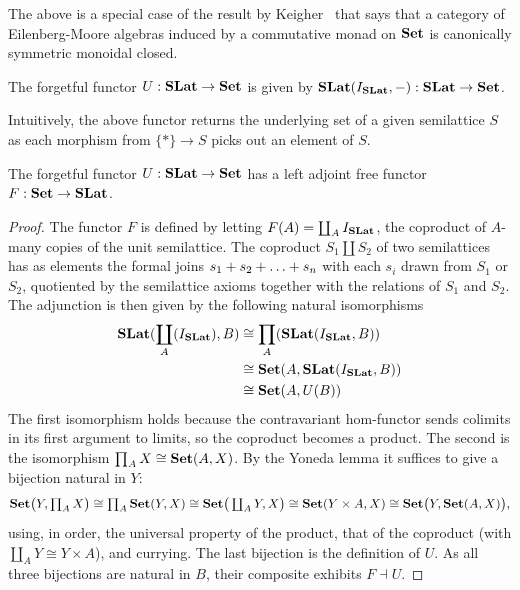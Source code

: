 \begin{remark}
The above is a special case of the result by Keigher~\cite{keigher_symmetric_nodate} that says that a category of Eilenberg-Moore algebras induced by a commutative monad on $\mathbf{Set}$ is canonically symmetric monoidal closed.
\end{remark}
\begin{definition}
	The forgetful functor $U : \mathbf{SLat} \to \mathbf{Set}$ is given by $\mathbf{SLat}(I_{\mathbf{SLat}}, -) : \mathbf{SLat} \to \mathbf{Set}$.
\end{definition}

Intuitively, the above functor returns the underlying set of a given semilattice $S$ as each morphism from $\{*\} \to S$ picks out an element of $S$.

\begin{proposition}\label{prop:slat-free}
	The forgetful functor $U : \mathbf{SLat} \to \mathbf{Set}$ has a left adjoint free functor $F : \mathbf{Set} \to \mathbf{SLat}$.
\end{proposition}
\begin{proof}
	The functor $F$ is defined by letting $F(A) = \coprod_{A} I_{\mathbf{SLat}}$, the coproduct of $A$-many copies of the unit semilattice.
	The coproduct $S_{1} \coprod S_{2}$ of two semilattices has as elements the formal joins $s_{1} + s_{2} + \ldots + s_{n}$ with each $s_{i}$ drawn from $S_{1}$ or $S_{2}$, quotiented by the semilattice axioms together with the relations of $S_{1}$ and $S_{2}$.
	The adjunction is then given by the following natural isomorphisms
	\begin{align*}
		\mathbf{SLat}(\coprod_{A}(I_{\mathbf{SLat}}), B) & \cong \prod_{A}(\mathbf{SLat}(I_{\mathbf{SLat}}, B))       \\
		                                                   & \cong \mathbf{Set}(A,\mathbf{SLat}(I_{\mathbf{SLat}}, B)) \\
		                                                   & \cong \mathbf{Set}(A, U(B))
	\end{align*}
	The first isomorphism holds because the contravariant hom-functor sends colimits in its first argument to limits, so the coproduct becomes a product.
	The second is the isomorphism $\prod_{A} X \cong \mathbf{Set}(A, X)$. By the Yoneda lemma it suffices to give a bijection natural in $Y$:
	\[
	\mathbf{Set}\big(Y, \textstyle\prod_A X\big) \cong \prod_A \mathbf{Set}(Y, X) \cong \mathbf{Set}\big(\textstyle\coprod_A Y, X\big) \cong \mathbf{Set}(Y \times A, X) \cong \mathbf{Set}\big(Y, \mathbf{Set}(A,X)\big),
	\]
	using, in order, the universal property of the product, that of the coproduct (with $\coprod_A Y \cong Y \times A$), and currying.
    The last bijection is the definition of $U$.
	As all three bijections are natural in $B$, their composite exhibits $F \dashv U$.
\end{proof}

